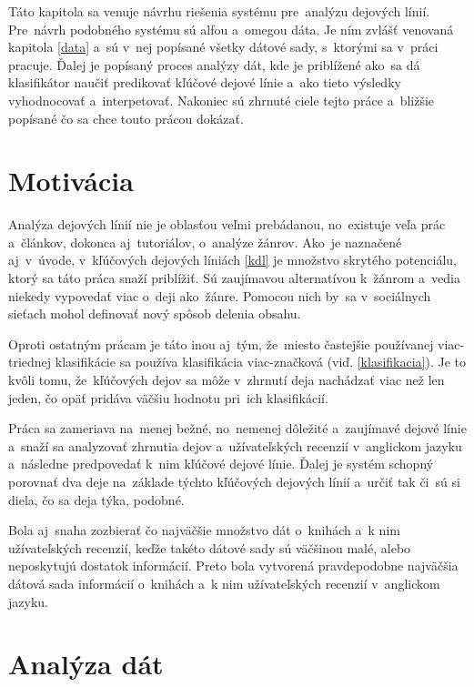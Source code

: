 Táto kapitola sa venuje návrhu riešenia systému pre~analýzu dejových línií. Pre~návrh podobného systému sú alfou a~omegou dáta. Je ním zvlášť venovaná kapitola \ref{data} a~sú v~nej popísané všetky dátové sady, s~ktorými sa v~práci pracuje. Ďalej je popísaný proces analýzy dát, kde je priblížené ako~sa dá klasifikátor naučiť predikovať kľúčové dejové línie a~ako tieto výsledky vyhodnocovať a~interpetovať. Nakoniec sú zhrnuté ciele tejto práce a~bližšie popísané čo sa chce touto prácou dokázať. 

\section{Motivácia}

Analýza dejových línií nie je oblasťou veľmi prebádanou, no~existuje veľa prác a~článkov, dokonca aj~tutoriálov, o~analýze žánrov. Ako~je naznačené aj~v~úvode, v~kľúčových dejových líniách \ref{kdl} je množstvo skrytého potenciálu, ktorý sa táto práca snaží priblížiť. Sú zaujímavou alternatívou k~žánrom a~vedia niekedy vypovedať viac o~deji ako~žánre. Pomocou nich by~sa v~sociálnych sieťach mohol definovať nový spôsob delenia obsahu. 

Oproti ostatným prácam je táto inou aj~tým, že~miesto častejšie používanej viac-triednej klasifikácie sa používa klasifikácia viac-značková (viď. \ref{klasifikacia}). Je to kvôli tomu, že~kľúčových dejov sa môže v~zhrnutí deja nachádzať viac než len jeden, čo opäť pridáva väčšiu hodnotu pri~ich klasifikácií.

Práca sa zameriava na~menej bežné, no~nemenej dôležité a~zaujímavé dejové línie a~snaží sa analyzovať zhrnutia dejov a~užívateľských recenzií v~anglickom jazyku a~následne predpovedať k~nim kľúčové dejové línie. Ďalej je systém schopný porovnať dva deje na~základe týchto kľúčových dejových línií a~určiť tak či~sú si diela, čo sa deja týka, podobné.

Bola aj~snaha zozbierať čo najväčšie množstvo dát o~knihách a~k nim užívateľských recenzií, keďže takéto dátové sady sú väčšinou malé, alebo neposkytujú dostatok informácií. Preto bola vytvorená pravdepodobne najväčšia dátová sada informácií o~knihách a~k nim užívateľských recenzií v~anglickom jazyku.

\section{Analýza dát}

